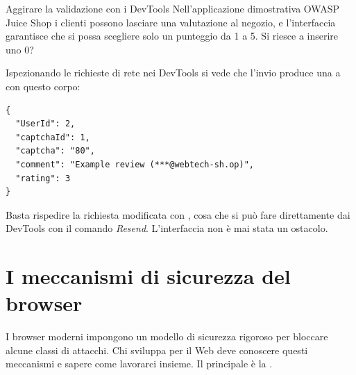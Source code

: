 \begin{esempio}{Aggirare la validazione con i DevTools}
Nell'applicazione dimostrativa OWASP Juice Shop i clienti possono lasciare una
valutazione al negozio, e l'interfaccia garantisce che si possa scegliere solo
un punteggio da 1 a 5. Si riesce a inserire uno 0?

Ispezionando le richieste di rete nei DevTools si vede che l'invio produce una
 a  con questo corpo:

\begin{affianco}[0.46][c]
\begin{lstlisting}[style=json, name=corpo della richiesta]
{
  "UserId": 2,
  "captchaId": 1,
  "captcha": "80",
  "comment": "Example review (***@webtech-sh.op)",
  "rating": 3
}
\end{lstlisting}
\risultato
\begin{immagine}
\end{immagine}
\end{affianco}

Basta rispedire la richiesta modificata con , cosa che si può
fare direttamente dai DevTools con il comando \textit{Resend}. L'interfaccia
non è mai stata un ostacolo.
\end{esempio}

\section{I meccanismi di sicurezza del browser}

I browser moderni impongono un modello di sicurezza rigoroso per bloccare
alcune classi di attacchi. Chi sviluppa per il Web deve conoscere questi
meccanismi e sapere come lavorarci insieme. Il principale è la .

